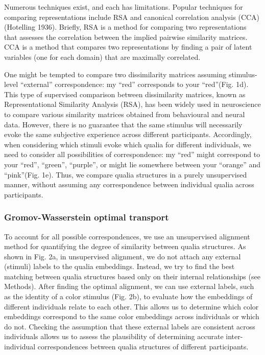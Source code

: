 \documentclass[
  authoryear]{elsarticle}
\begin{document}
Numerous techniques exist, and each has limitations. Popular techniques
for comparing representations include RSA \citet{kriegeskorte2008} and
canonical correlation analysis (CCA) (Hotelling 1936). Briefly, RSA is a
method for comparing two representations that assesses the correlation
between the implied pairwise similarity matrices. CCA is a method that
compares two representations by finding a pair of latent variables (one
for each domain) that are maximally correlated.

One might be tempted to compare two dissimilarity matrices assuming
stimulus-level ``external'' correspondence: my ``red'' corresponds to
your ``red''(Fig. 1d). This type of supervised comparison between
dissimilarity matrices, known as Representational Similarity Analysis
(RSA), has been widely used in neuroscience to compare various
similarity matrices obtained from behavioural and neural data. However,
there is no guarantee that the same stimulus will necessarily evoke the
same subjective experience across different participants. Accordingly,
when considering which stimuli evoke which qualia for different
individuals, we need to consider all possibilities of correspondence: my
``red'' might correspond to your ``red'', ``green'', ``purple'', or
might lie somewhere between your ``orange'' and ``pink''(Fig. 1e). Thus,
we compare qualia structures in a purely unsupervised manner, without
assuming any correspondence between individual qualia across
participants.

\subsubsection{Gromov-Wasserstein optimal
transport}\label{gromov-wasserstein-optimal-transport}

To account for all possible correspondences, we use an unsupervised
alignment method for quantifying the degree of similarity between qualia
structures. As shown in Fig. 2a, in unsupervised alignment, we do not
attach any external (stimuli) labels to the qualia embeddings. Instead,
we try to find the best matching between qualia structures based only on
their internal relationships (see Methods). After finding the optimal
alignment, we can use external labels, such as the identity of a color
stimulus (Fig. 2b), to evaluate how the embeddings of different
individuals relate to each other. This allows us to determine which
color embeddings correspond to the same color embeddings across
individuals or which do not. Checking the assumption that these external
labels are consistent across individuals allows us to assess the
plausibility of determining accurate inter-individual correspondences
between qualia structures of different participants.
\end{document}
